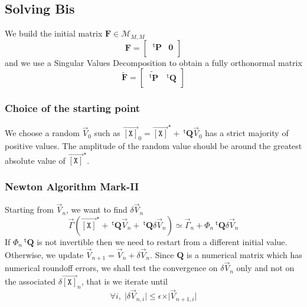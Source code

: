 \documentclass[aps,twocolumn]{revtex4}
\newcommand{\myconc}[1]{\left\lbrack #1 \right\rbrack}
\newcommand{\mychem}[1]{{\mathtt{#1}}}
\newcommand{\mymat}[1]{\boldsymbol{#1}}
\newcommand{\mytrn}[1]{{\!\!~^{\mathsf{t}}{#1}}}
\newcommand{\myvec}[1]{\overrightarrow{#1}}
\newcommand{\vecX}{\myvec{\myconc{\mychem{X}}}}
\begin{document}
\subsection{Solving Bis}
We build the initial matrix $\mymat{F}\in\mathcal{M}_{M,M}$
\begin{equation}
	\mymat{F} = 
	\left\lbrack
	\begin{array}{cc}
	\mytrn{\mymat{P}} & \mymat{0} \\
	\end{array}
	\right\rbrack
\end{equation}
and we use a Singular Values Decomposition to obtain a fully
orthonormal matrix
\begin{equation}
	\tilde{\mymat{F}} = 
	\left\lbrack
	\begin{array}{cc}
	\tilde{\mytrn{\mymat{P}}} & \mytrn{\mymat{Q}} \\
	\end{array}
	\right\rbrack
\end{equation}

\subsubsection{Choice of the starting point}
We choose a random $\vec{V}_0$ such as $\vecX_0 = \vecX^\star +  \mytrn{\mymat{Q}}\vec{V}_0$ has a strict majority of
positive values.
The amplitude of the random value
should be around the greatest absolute value of $\vecX^\star$.

\subsubsection{Newton Algorithm Mark-II}
Starting from $\vec{V}_{n}$, we want to find $\delta\vec{V}_n$
\begin{equation}
	\vec{\Gamma}\left(\vecX^\star +  \mytrn{\mymat{Q}}\vec{V}_n + \mytrn{\mymat{Q}}\delta\vec{V}_n\right)
	\simeq \vec{\Gamma}_{n} + \Phi_n  \mytrn{\mymat{Q}} \delta\vec{V}_n
\end{equation}
If $\Phi_n  \mytrn{\mymat{Q}}$ is not invertible then we need to restart from a different initial value.\\
Otherwise, we update $\vec{V}_{n+1}= \vec{V}_{n} + \delta\vec{V}_{n}$.
Since $\mymat{Q}$ is a numerical matrix which has numerical roundoff errors, we shall test the convergence
 on $\delta\vec{V}_{n}$ only and not on the associated $\delta \vecX_n$, that is
we iterate until
\begin{equation}
	\forall i, \; \vert\delta\vec{V}_{n,i}\vert \leq \epsilon \times \vert \vec{V}_{n+1,i}\vert
\end{equation}
\end{document}
